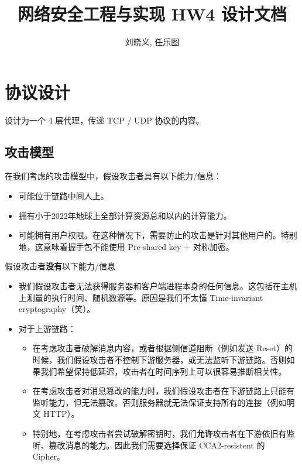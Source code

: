 \documentclass{ctexart}
\title{网络安全工程与实现 HW4 设计文档}
\author{刘晓义, 任乐图}
\begin{document}
  \maketitle

  \tableofcontents

  \section{协议设计}

  设计为一个 4 层代理，传递 TCP / UDP 协议的内容。

  \subsection{攻击模型}

  在我们考虑的攻击模型中，假设攻击者具有以下能力/信息：

  \begin{itemize}
    \item 可能位于链路中间人上。
    \item 拥有小于2022年地球上全部计算资源总和以内的计算能力。
    \item 可能拥有用户权限。在这种情况下，需要防止的攻击是针对其他用户的。特别地，这意味着握手包不能使用 Pre-shared key + 对称加密。
  \end{itemize}

  假设攻击者\textbf{没有}以下能力/信息
  \begin{itemize}
    \item 我们假设攻击者无法获得服务器和客户端进程本身的任何信息。这包括在主机上测量的执行时间、随机数源等。原因是我们不太懂 Time-invariant cryptography（笑）。
    \item 对于上游链路：
    \begin{itemize}
      \item 在考虑攻击者破解消息内容，或者根据侧信道阻断（例如发送 Reset）的时候，我们假设攻击者不控制下游服务器，或无法监听下游链路。否则如果我们希望保持低延迟，攻击者在时间序列上可以很容易推断相关性。
      \item 在考虑攻击者对消息篡改的能力时，我们假设攻击者在下游链路上只能有监听能力，但无法篡改。否则服务器就无法保证支持所有的连接（例如明文 HTTP）。
      \item 特别地，在考虑攻击者尝试破解密钥时，我们\textbf{允许}攻击者在下游依旧有监听、篡改消息的能力。因此我们需要选择保证 CCA2-resistent 的 Cipher。
    \end{itemize}
  \end{itemize}
\end{document}
